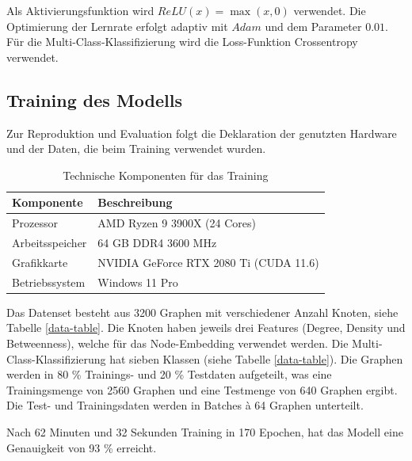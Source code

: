 Als Aktivierungsfunktion wird $ ReLU(x) = \max(x, 0) $ verwendet. Die Optimierung der Lernrate erfolgt adaptiv mit $Adam$ \cite{kingma_adam_2017} und dem Parameter $ 0.01 $.
Für die Multi-Class-Klassifizierung wird die Loss-Funktion Crossentropy verwendet.

\subsection{Training des Modells}

Zur Reproduktion und Evaluation folgt die Deklaration der genutzten Hardware und der Daten, die beim Training verwendet wurden.

\begin{table}[H]
    \begin{adjustbox}{minipage=\textwidth, center}
        \scriptsize
        \begin{tabularx}{\textwidth}{|l|X|}
            \hline
            \textbf{Komponente} & \textbf{Beschreibung}                  \\
            \hline
            Prozessor           & AMD Ryzen 9 3900X (24 Cores)           \\
            Arbeitsspeicher     & 64 GB DDR4 3600 MHz                    \\
            Grafikkarte         & NVIDIA GeForce RTX 2080 Ti (CUDA 11.6) \\
            Betriebssystem      & Windows 11 Pro                         \\
            \hline
        \end{tabularx}
    \end{adjustbox}
    \caption{\label{tab:tech-spec}Technische Komponenten für das Training}
\end{table}

Das Datenset besteht aus 3200 Graphen mit verschiedener Anzahl Knoten, siehe Tabelle \ref{data-table}. 
Die Knoten haben jeweils drei Features (Degree, Density und Betweenness), welche für das Node-Embedding verwendet werden.
Die Multi-Class-Klassifizierung hat sieben Klassen (siehe Tabelle \ref{data-table}). Die Graphen werden in 80 \% Trainings- und 20 \% Testdaten aufgeteilt, was eine Trainingsmenge von 2560 Graphen und eine Testmenge von 640 Graphen ergibt.
Die Test- und Trainingsdaten werden in Batches à 64 Graphen unterteilt.

Nach 62 Minuten und 32 Sekunden Training in 170 Epochen, hat das Modell eine Genauigkeit von 93 \% erreicht. 

